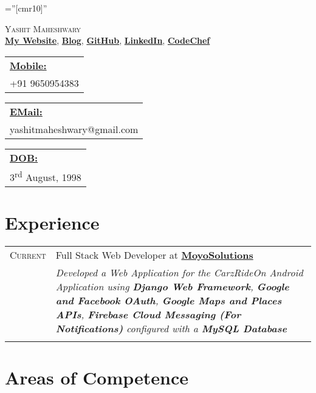\documentclass[a4paper,10pt]{article}
\begin{document}
\pagestyle{empty}

\font\fb=''[cmr10]''

\par{\centering
		{\Huge \textsc{Yashit Maheshwary}\\
		}
		\href{https://yashitm.tech/}{\textbf{My Website}}, \href{https://medium.com/@yashitmaheshwary}{\textbf{Blog}}, \href{https://www.github.com/YashitM}{\textbf{GitHub}}, \href{https://www.linkedin.com/in/yashit-maheshwary-aa8078b2/}{\textbf{LinkedIn}}, \href{https://www.codechef.com/users/yashitm}{\textbf{CodeChef}}
	\par}
\begin{tabular}[t]{@{}l} 
    \underline{\textbf{Mobile:}}\\  +91 9650954383
\end{tabular}
\hfill
\begin{tabular}[t]{l@{}}
    \underline{\textbf{EMail:}}\\ yashitmaheshwary@gmail.com
\end{tabular}
\hfill
\begin{tabular}[t]{l@{}}
    \underline{\textbf{DOB:}}\\ 3\textsuperscript{rd} August, 1998
\end{tabular}

\section{Experience}
\begin{tabular}{r|p{14cm}}
\textsc{Current} & Full Stack Web Developer at \href{http://www.moyosolutions.online}{\textbf{MoyoSolutions}}\\
& \emph{\small{Developed a Web Application for the CarzRideOn Android Application using \textbf{Django Web Framework}, \textbf{Google and Facebook OAuth}, \textbf{Google Maps and Places APIs}, \textbf{Firebase Cloud Messaging (For Notifications)} configured with a \textbf{MySQL Database}}}\\\multicolumn{2}{c}{}
\end{tabular}


\section{Areas of Competence}
\begin{Parallel}{0.45\textwidth}{0.53\textwidth}
\ParallelPar
\end{Parallel}
\end{document}

